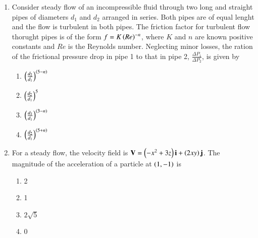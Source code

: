 \documentclass[journal,12pt,onecolumn]{IEEEtran}
\theoremstyle{remark}
\begin{document}
\begin{enumerate}
\begin{multicols}{4}
\begin{enumerate}
            \end{enumerate}
        \end{multicols}
    \item Consider steady flow of an incompressible fluid through two long and straight pipes of 
        diameters $d_1$ and $d_2$ arranged in series. Both pipes are of equal lenght and the flow is 
        turbulent in both pipes. The friction factor for turbulent flow thorught pipes is of the form 
        $f = K\left(Re\right)^{-n}$, where $K$ and $n$ are known positive constants and $Re$ is the Reynolds
        number. Neglecting minor losses, the ration of the frictional pressure drop in pipe 1 to 
        that in pipe 2, $\frac{\Delta P_1}{\Delta P_2}$, is given by
        \hfill{}

        \begin{multicols}{4}
            \begin{enumerate}
                \item $\left(\frac{d_2}{d_1}\right)^{\left(5-n\right)}$
                    \columnbreak
                \item $\left(\frac{d_2}{d_1}\right)^5$
                    \columnbreak
                \item $\left(\frac{d_2}{d_1}\right)^{\left(3-n\right)}$
                    \columnbreak
                \item $\left(\frac{d_2}{d_1}\right)^{\left(5+n\right)}$
            \end{enumerate}
        \end{multicols}

    \item For a steady flow, the velocity field is $\mathbf{V} = \left(-x^2 + 3z\right)\mathbf{i} + \left(2xy\right)\mathbf{j}$.
        The magnitude of the acceleration of a particle at $\left(1, -1\right)$ is
        \hfill{}
        \begin{multicols}{4}
            \begin{enumerate}
                \item 2
                    \columnbreak
                \item 1
                    \columnbreak
                \item $2\sqrt{5}$
                    \columnbreak
                \item 0
            \end{enumerate}
        \end{multicols}


\end{enumerate}
\end{document}

